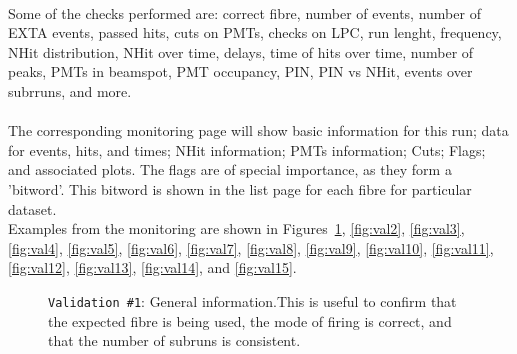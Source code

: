 \documentclass[12pt]{article}
\begin{document}
\paragraph{}
Some of the checks performed are: correct fibre, number of events, number of EXTA events, passed hits, cuts on PMTs, checks on LPC, run lenght, frequency, NHit distribution, NHit over time, delays, time of hits over time, number of peaks, PMTs in beamspot, PMT occupancy, PIN, PIN vs NHit, events over subrruns, and more.

\paragraph{}
The corresponding monitoring page will show basic information for this run; data for events, hits, and times; NHit information; PMTs information; Cuts; Flags; and associated plots. The flags are of special importance, as they form a 'bitword'. This bitword is shown in the list page for each fibre for particular dataset.\\
Examples from the monitoring are shown in Figures~\ref{fig:val1}, \ref{fig:val2}, \ref{fig:val3}, \ref{fig:val4}, \ref{fig:val5}, \ref{fig:val6}, \ref{fig:val7}, \ref{fig:val8}, \ref{fig:val9}, \ref{fig:val10}, \ref{fig:val11}, \ref{fig:val12}, \ref{fig:val13}, \ref{fig:val14}, and \ref{fig:val15}.

\begin{figure}
\centering
\noindent{}
  \caption{\centering \texttt{Validation \#1}: General information.\hspace{\textwidth}This is useful to confirm that the expected fibre is being used, the mode of firing is correct, and that the number of subruns is consistent.}
  \label{fig:val1}
\end{figure}
\end{document}
